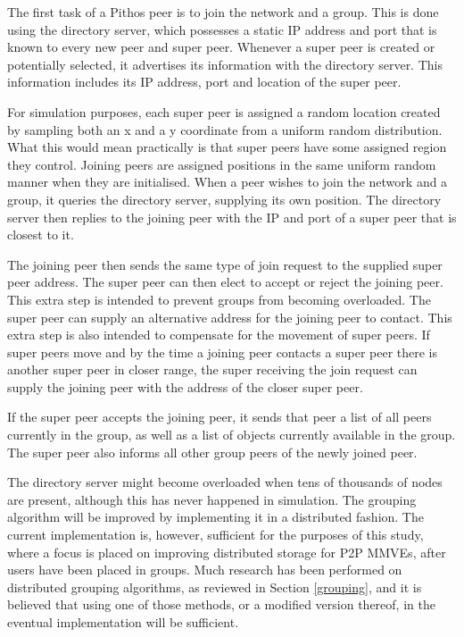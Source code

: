     The first task of a Pithos peer is to join the network and a group. This is done using the directory server, which possesses a static IP address and port that is known to every new peer and super peer. Whenever a super peer is created or potentially selected, it advertises its information with the directory server. This information includes its IP address, port and location of the super peer.

    For simulation purposes, each super peer is assigned a random location created by sampling both an x and a y coordinate from a uniform random distribution. What this would mean practically is that super peers have some assigned region they control. Joining peers are assigned positions in the same uniform random manner when they are initialised. When a peer wishes to join the network and a group, it queries the directory server, supplying its own position. The directory server then replies to the joining peer with the IP and port of a super peer that is closest to it.

    The joining peer then sends the same type of join request to the supplied super peer address. The super peer can then elect to accept or reject the joining peer. This extra step is intended to prevent groups from becoming overloaded. The super peer can supply an alternative address for the joining peer to contact. This extra step is also intended to compensate for the movement of super peers. If super peers move and by the time a joining peer contacts a super peer there is another super peer in closer range, the super receiving the join request can supply the joining peer with the address of the closer super peer.

    If the super peer accepts the joining peer, it sends that peer a list of all peers currently in the group, as well as a list of objects currently available in the group. The super peer also informs all other group peers of the newly joined peer.

    The directory server might become overloaded when tens of thousands of nodes are present, although this has never happened in simulation. The grouping algorithm will be improved by implementing it in a distributed fashion. The current implementation is, however, sufficient for the purposes of this study, where a focus is placed on improving distributed storage for P2P MMVEs, after users have been placed in groups. Much research has been performed on distributed grouping algorithms, as reviewed in Section \ref{grouping}, and it is believed that using one of those methods, or a modified version thereof, in the eventual implementation will be sufficient.

